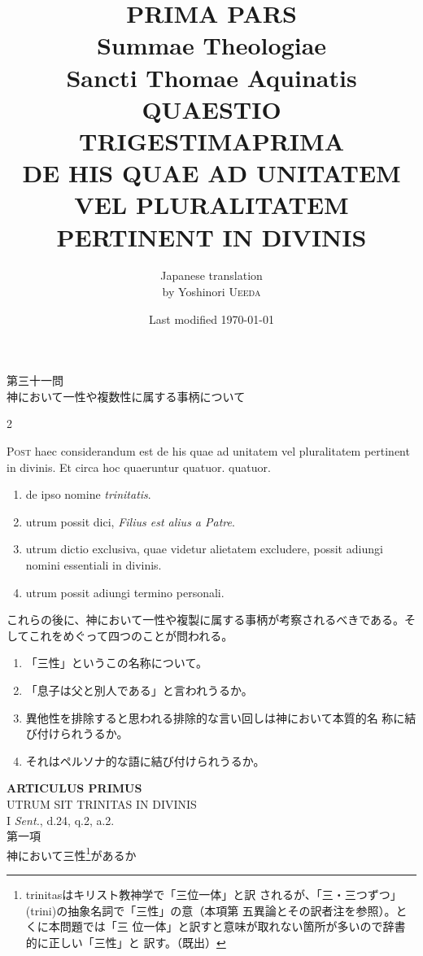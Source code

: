 \documentclass[paper=a4paper,fontsize=10pt,jafontsize=9pt,titlepage]{jlreq}
\title{{\bfseries PRIMA PARS}\\{\Huge Summae Theologiae}\\Sancti Thomae
Aquinatis\\{\sffamily QUAESTIO TRIGESTIMAPRIMA}\\DE HIS QUAE AD
UNITATEM VEL PLURALITATEM PERTINENT IN DIVINIS}
\author{Japanese translation\\by Yoshinori {\scshape Ueeda}}
\date{Last modified \today}
\begin{document}
\maketitle

\begin{center}
{\Large 第三十一問\\神において一性や複数性に属する事柄について}
\end{center}


\begin{paracol}{2}

{\Huge P}{\scshape ost} haec considerandum est de his quae ad unitatem
 vel pluralitatem pertinent in divinis. Et circa hoc quaeruntur quatuor.
quatuor. 

\begin{enumerate}
 \item de ipso nomine {\itshape trinitatis}.
 \item utrum possit dici, {\itshape Filius est alius a Patre}.
 \item utrum dictio exclusiva, quae videtur alietatem excludere,
       possit adiungi nomini essentiali in divinis.
 \item utrum possit adiungi termino personali.
\end{enumerate}

\switchcolumn

これらの後に、神において一性や複製に属する事柄が考察されるべきである。そ
 してこれをめぐって四つのことが問われる。

\begin{enumerate}
 \item 「三性」というこの名称について。
 \item 「息子は父と別人である」と言われうるか。
 \item 異他性を排除すると思われる排除的な言い回しは神において本質的名
       称に結び付けられうるか。
 \item それはペルソナ的な語に結び付けられうるか。
\end{enumerate}

\end{paracol}




\newpage

\begin{center}
{\Large {\bfseries ARTICULUS PRIMUS}}\\
{\large UTRUM SIT TRINITAS IN DIVINIS}\\
{\footnotesize I {\itshape Sent.}, d.24, q.2, a.2.}\\
{\Large 第一項\\神において三性\footnote{trinitasはキリスト教神学で「三位一体」と訳
 されるが、「三・三つずつ」(trini)の抽象名詞で「三性」の意（本項第
 五異論とその訳者注を参照）。とくに本問題では「三
 位一体」と訳すと意味が取れない箇所が多いので辞書的に正しい「三性」と
 訳す。（既出）}があるか}
\end{center}
\end{document}
